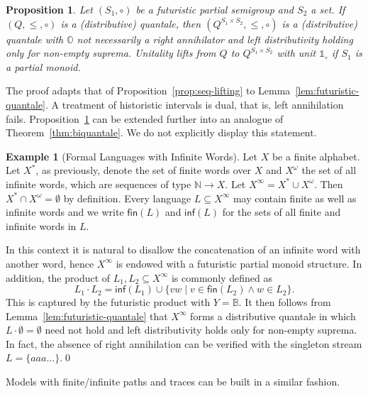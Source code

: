 \documentclass[12pt]{article}
\newcommand{\Al}{X}
\newtheorem{proposition}{Proposition}
\theoremstyle{definition}
\newtheorem{example}{Example}
\newcommand{\unit}{\mathbb{1}}
\newcommand{\zero}{\mathbb{O}}
\begin{document}
\begin{proposition}\label{prop:futuristic-biquantale}
  Let $(S_1,\circ)$ be a futuristic partial semigroup and $S_2$ a set.
  If $(Q,\le, \circ)$ is a (distributive) quantale, then
  $(Q^{S_1\times S_2},\le,\circ)$ is a (distributive) quantale with
  $\zero$ not necessarily a right annihilator and left distributivity
  holding only for non-empty suprema. Unitality lifts from $Q$ to
  $Q^{S_1\times S_2}$ with unit $\unit_\circ$ if $S_1$ is a partial
  monoid.
\end{proposition}
The proof adapts that of Proposition~\ref{prop:seq-lifting} to
Lemma~\ref{lem:futuristic-quantale}. A treatment of historistic
intervals is dual, that is, left annihilation
fails. Proposition~\ref{prop:futuristic-biquantale} can be extended
further into an analogue of Theorem~\ref{thm:biquantale}. We do not
explicitly display this statement.

\begin{example}[Formal Languages with Infinite Words]
  Let $\Al$ be a finite alphabet. Let $\Al^\ast$, as previously,
  denote the set of finite words over $\Al$ and $\Al^\omega$ the
  set of all infinite words, which are sequences of type
  $\mathbb{N}\to \Al$. Let
  $\Al^\infty=\Al^\ast\cup\Al^\omega$. Then $\Al^\ast\cap
  \Al^\omega=\emptyset$ by definition. Every language
  $L\subseteq\Al^\infty$ may contain finite as well as infinite
  words and we write $\mathsf{fin}(L)$ and $\mathsf{inf}(L)$ for
  the sets of all finite and infinite words in $L$.

  In this context it is natural to disallow the concatenation of an
  infinite word with another word, hence $\Al^\infty$ is endowed
  with a futuristic partial monoid structure. In addition, the product
  of $L_1,L_2\subseteq\Al^\infty$ is commonly defined as
  \begin{equation*}
    L_1\cdot L_2=\mathsf{inf}(L_1)\cup \{vw \mid v\in\mathsf{fin}(L_2)\wedge w\in L_2\}.
  \end{equation*}
  This is captured by the futuristic product with $Y=\mathbb{B}$. It
  then follows from Lemma~\ref{lem:futuristic-quantale} that
  $\Al^\infty$ forms a distributive quantale in which
  $L\cdot\emptyset=\emptyset$ need not hold and left distributivity
  holds only for non-empty suprema. In fact, the absence of right
  annihilation can be verified with the singleton stream
  $L=\{aaa\dots\}$.\qed
\end{example}
Models with finite/infinite paths and traces can be built in a similar
fashion.
\end{document}
